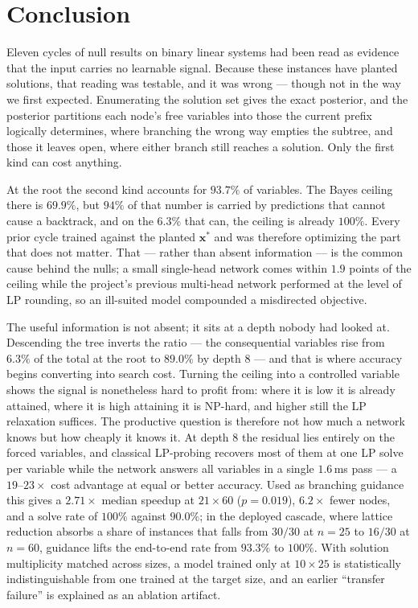 \documentclass[12pt]{article}
\begin{document}
\section{Conclusion}
\label{sec:conclusion}

Eleven cycles of null results on binary linear systems had been read as evidence that the input carries no learnable signal. Because these instances have planted solutions, that reading was testable, and it was wrong --- though not in the way we first expected. Enumerating the solution set gives the exact posterior, and the posterior partitions each node's free variables into those the current prefix logically determines, where branching the wrong way empties the subtree, and those it leaves open, where either branch still reaches a solution. Only the first kind can cost anything.

At the root the second kind accounts for $93.7\%$ of variables. The Bayes ceiling there is $69.9\%$, but $94\%$ of that number is carried by predictions that cannot cause a backtrack, and on the $6.3\%$ that can, the ceiling is already $100\%$. Every prior cycle trained against the planted $\mathbf{x}^\ast$ and was therefore optimizing the part that does not matter. That --- rather than absent information --- is the common cause behind the nulls; a small single-head network comes within $1.9$ points of the ceiling while the project's previous multi-head network performed at the level of LP rounding, so an ill-suited model compounded a misdirected objective.

The useful information is not absent; it sits at a depth nobody had looked at. Descending the tree inverts the ratio --- the consequential variables rise from $6.3\%$ of the total at the root to $89.0\%$ by depth $8$ --- and that is where accuracy begins converting into search cost. Turning the ceiling into a controlled variable shows the signal is nonetheless hard to profit from: where it is low it is already attained, where it is high attaining it is NP-hard, and higher still the LP relaxation suffices. The productive question is therefore not how much a network knows but how cheaply it knows it. At depth $8$ the residual lies entirely on the forced variables, and classical LP-probing recovers most of them at one LP solve per variable while the network answers all variables in a single $1.6$\,ms pass --- a $19$--$23\times$ cost advantage at equal or better accuracy. Used as branching guidance this gives a $2.71\times$ median speedup at $21\times60$ ($p=0.019$), $6.2\times$ fewer nodes, and a solve rate of $100\%$ against $90.0\%$; in the deployed cascade, where lattice reduction absorbs a share of instances that falls from $30/30$ at $n=25$ to $16/30$ at $n=60$, guidance lifts the end-to-end rate from $93.3\%$ to $100\%$. With solution multiplicity matched across sizes, a model trained only at $10\times25$ is statistically indistinguishable from one trained at the target size, and an earlier ``transfer failure'' is explained as an ablation artifact.
\end{document}
